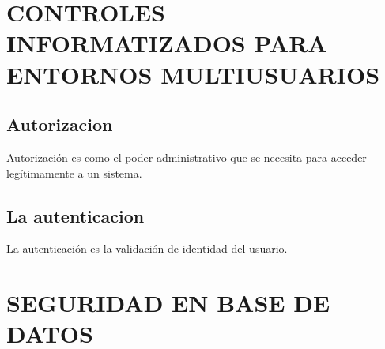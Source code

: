 \documentclass[conference]{IEEEtran}
\begin{document}
\section{CONTROLES INFORMATIZADOS PARA ENTORNOS MULTIUSUARIOS}
\subsection{Autorizacion}
Autorización es como el poder administrativo que se necesita para acceder legítimamente a un sistema.
\subsection{La autenticacion}
La autenticación es la validación de identidad del usuario.

\section{SEGURIDAD EN BASE DE DATOS}
\end{document}
